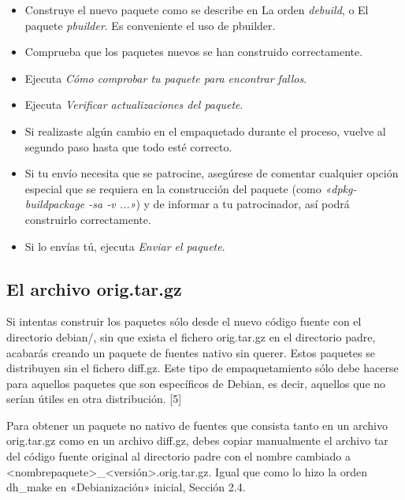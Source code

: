 \documentclass[letterpaper,12pt,spanish]{manual}
\begin{document}
\begin{itemize}
\item {} 
Construye el nuevo paquete como se describe en La orden \emph{debuild}, o El paquete \emph{pbuilder}. Es conveniente el uso de pbuilder.

\item {} 
Comprueba que los paquetes nuevos se han construido correctamente.

\item {} 
Ejecuta \emph{Cómo comprobar tu paquete para encontrar fallos}.

\item {} 
Ejecuta \emph{Verificar actualizaciones del paquete}.

\item {} 
Si realizaste algún cambio en el empaquetado durante el proceso, vuelve al segundo paso hasta que todo esté correcto.

\item {} 
Si tu envío necesita que se patrocine, asegúrese de comentar cualquier opción especial que se requiera en la construcción del paquete (como \emph{«dpkg-buildpackage -sa -v ...»}) y de informar a tu patrocinador, así podrá construirlo correctamente.

\item {} 
Si lo envías tú, ejecuta \emph{Enviar el paquete}.

\end{itemize}


\subsection{El archivo orig.tar.gz}

Si intentas construir los paquetes sólo desde el nuevo código fuente con el directorio debian/, sin que exista el fichero orig.tar.gz en el directorio padre, acabarás creando un paquete de fuentes nativo sin querer. Estos paquetes se distribuyen sin el fichero diff.gz. Este tipo de empaquetamiento sólo debe hacerse para aquellos paquetes que son específicos de Debian, es decir, aquellos que no serían útiles en otra distribución. {[}5{]}

Para obtener un paquete no nativo de fuentes que consista tanto en un archivo orig.tar.gz como en un archivo diff.gz, debes copiar manualmente el archivo tar del código fuente original al directorio padre con el nombre cambiado a \textless{}nombrepaquete\textgreater{}\_\textless{}versión\textgreater{}.orig.tar.gz. Igual que como lo hizo la orden dh\_make en «Debianización» inicial, Sección 2.4.
\end{document}
